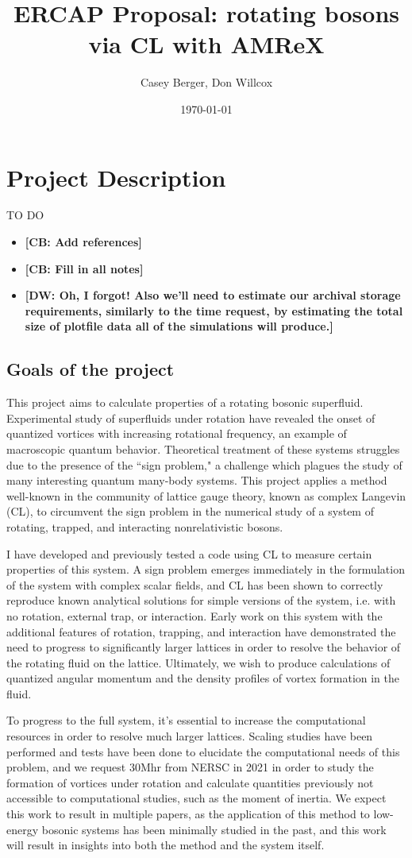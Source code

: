 \documentclass[onecolumn, 12pt]{article}
\title{ERCAP Proposal: rotating bosons via CL with AMReX}
\author{Casey Berger, Don Willcox}
\date{\today}
\newcommand{\casey}[1]{{\color{green} \bf[CB: #1]}}
\newcommand{\don}[1]{{\color{blue} \bf[DW: #1]}}
\begin{document}
\section{Project Description}
TO DO
\begin{itemize} 
	\item \casey{Add references}
	\item \casey{Fill in all notes}
	\item \don{Oh, I forgot! Also we'll need to estimate our archival storage requirements, similarly to the time request, by estimating the total size of plotfile data all of the simulations will produce.}
\end{itemize}
\subsection{Goals of the project}
This project aims to calculate properties of a rotating bosonic superfluid. Experimental study of superfluids under rotation have revealed the onset of quantized vortices with increasing rotational frequency, an example of macroscopic quantum behavior. Theoretical treatment of these systems struggles due to the presence of the ``sign problem," a challenge which plagues the study of many interesting quantum many-body systems. This project applies a method well-known in the community of lattice gauge theory, known as complex Langevin (CL), to circumvent the sign problem in the numerical study of a system of rotating, trapped, and interacting nonrelativistic bosons. 

I have developed and previously tested a code using CL to measure certain properties of this system. A sign problem emerges immediately in the formulation of the system with complex scalar fields, and CL has been shown to correctly reproduce known analytical solutions for simple versions of the system, i.e. with no rotation, external trap, or interaction. Early work on this system with the additional features of rotation, trapping, and interaction have demonstrated the need to progress to significantly larger lattices in order to resolve the behavior of the rotating fluid on the lattice. Ultimately, we wish to produce calculations of quantized angular momentum and the density profiles of vortex formation in the fluid.

To progress to the full system, it's essential to increase the computational resources in order to resolve much larger lattices. Scaling studies have been performed and tests have been done to elucidate the computational needs of this problem, and we request 30Mhr from NERSC in 2021 in order to study the formation of vortices under rotation and calculate quantities previously not accessible to computational studies, such as the moment of inertia. We expect this work to result in multiple papers, as the application of this method to low-energy bosonic systems has been minimally studied in the past, and this work will result in insights into both the method and the system itself.
\end{document}
